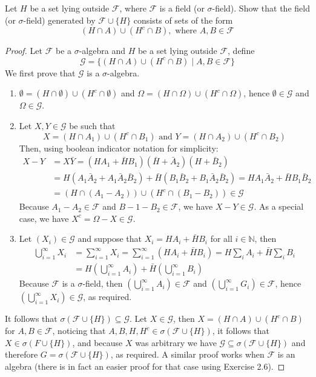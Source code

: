 \documentclass[12pt]{article}
\newcommand{\N}{\mathbb{N}}
\newcommand{\F}{\mathcal{F}}
\newcommand{\G}{\mathcal{G}}
\newcommand{\seq}{\subseteq}
\newcommand{\Om}{\Omega}
\newcommand{\es}{\emptyset}
\newcommand{\un}{\cup}
\newcommand{\ic}{\cap}
\newcommand{\Sum}{\sum\limits}
\newenvironment{exercise}[2][Exercise]{\begin{trivlist}
\item[\hskip \labelsep {\bfseries #1}\hskip \labelsep {\bfseries #2.}]}{\end{trivlist}}
\begin{document}
\begin{exercise}{2.7}
    Let $H$ be a set lying outside $\F$, where $\F$ is a field (or $\sigma$-field). Show that the field (or $\sigma$-field) generated by $\F \un \{ H \}$ consists of sets of the form
    \[ (H \ic A) \un (H^{c} \ic B), \text { where } A, B \in \F \]
\end{exercise}
\begin{proof}
    Let $\F$ be a $\sigma$-algebra and $H$ be a set lying outside $\F$, define
    \[ \G = \{ (H \ic A) \un (H^{c} \ic B) \mid A, B \in \F \} \]
    We first prove that $\G$ is a $\sigma$-algebra.
    \begin{enumerate}
        \item $\es = (H \ic \es) \un (H^{c} \ic \es)$ and $\Om = (H \ic \Om) \un (H^{c} \ic \Om)$, hence $\es \in \G$ and $\Om \in \G$.
        \item Let $X, Y \in \G$ be such that
        \[ X = (H \ic A_1) \un (H^{c} \ic B_1) \text{ and } Y = (H \ic A_2) \un (H^{c} \ic B_2) \]
        Then, using boolean indicator notation for simplicity:
        \begin{align*}
            X - Y &= X \bar{Y} = (H A_1 + \bar H B_1) (\bar H + \bar A_2) (H + \bar B_2) \\
            &= H(A_1 \bar A_2 + A_1 \bar A_2 \bar B_2) + \bar H (B_1 \bar B_2 + B_1 \bar A_2 \bar B_2) = H A_1 \bar A_2 + \bar H B_1 \bar B_2 \\
            &= (H \ic (A_1 - A_2)) \un (H^{c} \ic (B_1 - B_2)) \in \G
        \end{align*}
        Because $A_1 - A_2 \in \F$ and $B-1 - B_2 \in \F$, we have $X - Y \in \G$. As a special case, we have $X^{c} = \Om - X \in \G$.
        \item Let $(X_i) \in \G$ and suppose that $X_i = H A_i + \bar H B_i$ for all $i \in \N$, then
        \begin{align*}
            \bigcup_{i=1}^{\infty} X_i &= \Sum_{i=1}^{\infty} X_i = \Sum_{i=1}^{\infty} (H A_i + \bar H B_i) = H \Sum_{i} A_i + \bar H \Sum_{i} B_i \\
            &= H \left ( \bigcup_{i=1}^{\infty} A_i \right) + \bar{H} \left ( \bigcup_{i=1}^{\infty} B_i \right)
        \end{align*}
        Because $\F$ is a $\sigma$-field, then $\left ( \bigcup_{i=1}^{\infty} A_i \right) \in \F$ and $\left ( \bigcup_{i=1}^{\infty} G_i \right) \in \F$, hence $\left ( \bigcup_{i=1}^{\infty} X_i \right) \in \G$, as required.
    \end{enumerate}
    It follows that $\sigma(\F \un \{ H \}) \seq \G$. Let $X \in \G$, then $X = (H \ic A) \un (H^{c} \ic B)$ for $A, B \in \F$, noticing that $A, B, H, H^{c} \in \sigma (\F \un \{ H \})$, it follows that $X \in \sigma (F \un \{ H \})$, and because $X$ was arbitrary we have $\G \seq \sigma (\F \un \{ H \})$ and therefore $G = \sigma (\F \un \{ H \})$, as required. A similar proof works when $\F$ is an algebra (there is in fact an easier proof for that case using Exercise 2.6).
\end{proof}
\end{document}
